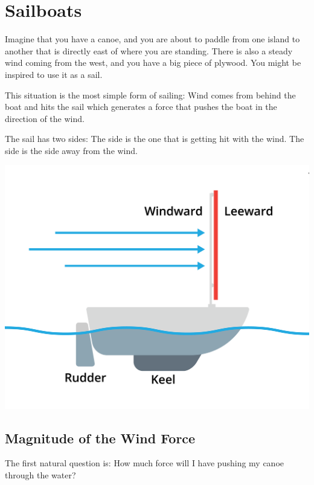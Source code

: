 \chapter{Sailboats}

Imagine that you have a canoe, and you are about to paddle from one island to another that is directly east of where you are standing. There 
is also a steady wind coming from the west, and you have a big piece of plywood.  You might be inspired to use it as a sail.

This situation is the most simple form of sailing: Wind comes from behind the boat and hits the sail which generates a force that pushes the 
boat in the direction of the wind.

The sail has two sides:  The  side is the one that is getting hit with the wind. The  side is the side away from the wind.

\begin{center}
    \includegraphics[width=.75\textwidth]{plywood.png}
    
\end{center}

\section{Magnitude of the Wind Force}

The first natural question is: How much force will I have pushing my canoe through the water?

